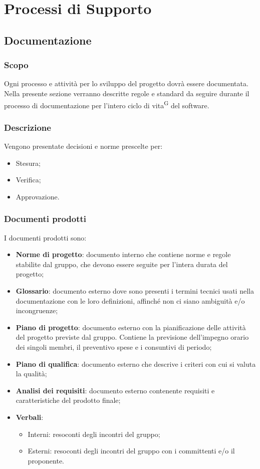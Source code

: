 \section{Processi di Supporto}
\subsection{Documentazione}
\subsubsection{Scopo}
Ogni processo e attività per lo sviluppo del progetto dovrà essere documentata. Nella presente sezione verranno descritte regole e standard da seguire durante il processo di documentazione per l'intero ciclo di vita\textsuperscript{G} del software.

\subsubsection{Descrizione}
Vengono presentate decisioni e norme prescelte per:
\begin{itemize}
  \item Stesura;
  \item Verifica;
  \item Approvazione.
\end{itemize}

\subsubsection{Documenti prodotti}
I documenti prodotti sono:
\begin{itemize}
  \item \textbf{Norme di progetto}: documento interno che contiene norme e regole stabilite dal gruppo, che devono essere seguite per l’intera durata del progetto;
  \item \textbf{Glossario}: documento esterno dove sono presenti i termini tecnici usati nella documentazione con le loro definizioni, affinché non ci siano ambiguità e/o incongruenze;
  \item \textbf{Piano di progetto}: documento esterno con la pianificazione delle attività del progetto previste dal gruppo. Contiene la previsione dell’impegno orario dei singoli membri, il preventivo spese e i consuntivi di periodo;
  \item \textbf{Piano di qualifica}: documento esterno che descrive i criteri con cui si valuta la qualità;
  \item \textbf{Analisi dei requisiti}: documento esterno contenente requisiti e caratteristiche del prodotto finale;
  \item \textbf{Verbali}:
  \begin{itemize}
  		\item Interni: resoconti degli incontri del gruppo;
  		\item Esterni: resoconti degli incontri del gruppo con i committenti e/o il proponente.
	\end{itemize}
\end{itemize}

